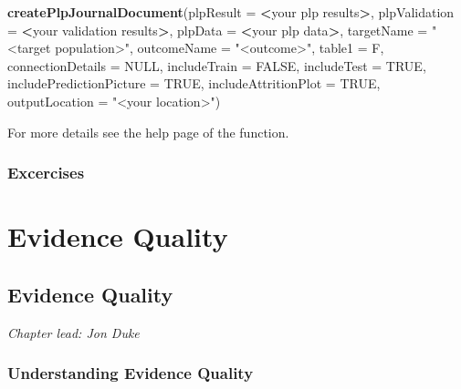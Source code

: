 \documentclass[11pt]{book}
\newenvironment{Shaded}{\begin{snugshade}}{\end{snugshade}}
\newcommand{\DataTypeTok}[1]{\textcolor[rgb]{0.13,0.29,0.53}{#1}}
\newcommand{\KeywordTok}[1]{\textcolor[rgb]{0.13,0.29,0.53}{\textbf{#1}}}
\newcommand{\NormalTok}[1]{#1}
\newcommand{\OperatorTok}[1]{\textcolor[rgb]{0.81,0.36,0.00}{\textbf{#1}}}
\newcommand{\OtherTok}[1]{\textcolor[rgb]{0.56,0.35,0.01}{#1}}
\newcommand{\StringTok}[1]{\textcolor[rgb]{0.31,0.60,0.02}{#1}}
\theoremstyle{definition}
\theoremstyle{definition}
\theoremstyle{definition}
\theoremstyle{remark}
\begin{document}
\begin{Shaded}
\begin{Highlighting}[]
 \KeywordTok{createPlpJournalDocument}\NormalTok{(}\DataTypeTok{plpResult =} \OperatorTok{<}\NormalTok{your plp results}\OperatorTok{>}\NormalTok{,}
                          \DataTypeTok{plpValidation =} \OperatorTok{<}\NormalTok{your validation results}\OperatorTok{>}\NormalTok{,}
                          \DataTypeTok{plpData =} \OperatorTok{<}\NormalTok{your plp data}\OperatorTok{>}\NormalTok{,}
                          \DataTypeTok{targetName =} \StringTok{"<target population>"}\NormalTok{,}
                          \DataTypeTok{outcomeName =} \StringTok{"<outcome>"}\NormalTok{,}
                          \DataTypeTok{table1 =}\NormalTok{ F,}
                          \DataTypeTok{connectionDetails =} \OtherTok{NULL}\NormalTok{,}
                          \DataTypeTok{includeTrain =} \OtherTok{FALSE}\NormalTok{,}
                          \DataTypeTok{includeTest =} \OtherTok{TRUE}\NormalTok{,}
                          \DataTypeTok{includePredictionPicture =} \OtherTok{TRUE}\NormalTok{,}
                          \DataTypeTok{includeAttritionPlot =} \OtherTok{TRUE}\NormalTok{,}
                          \DataTypeTok{outputLocation =} \StringTok{"<your location>"}\NormalTok{)}
\end{Highlighting}
\end{Shaded}

For more details see the help page of the function.

\hypertarget{excercises-1}{%
\section{Excercises}\label{excercises-1}}

\hypertarget{part-evidence-quality}{%
\part{Evidence Quality}\label{part-evidence-quality}}

\hypertarget{EvidenceQuality}{%
\chapter{Evidence Quality}\label{EvidenceQuality}}

\emph{Chapter lead: Jon Duke}

\hypertarget{understanding-evidence-quality}{%
\section{Understanding Evidence Quality}\label{understanding-evidence-quality}}
\end{document}
